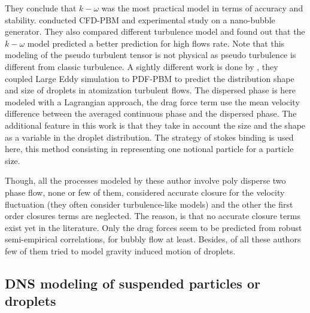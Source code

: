 They conclude that $k-\omega$ was the most practical model in terms of accuracy and stability.
\citet{alam2022cfd} conducted CFD-PBM and experimental study on a nano-bubble generator. 
They also compared different turbulence model and found out that the $k-\omega$ model predicted a better prediction for high flows rate.
Note that this modeling of the pseudo turbulent tensor is not physical as pseudo turbulence is different from classic turbulence.
A sightly different work is done by \citet{salehi2017population}, they coupled Large Eddy simulation to PDF-PBM to predict the distribution shape and size of droplets in atomization turbulent flows. 
The dispersed phase is here modeled with a Lagrangian approach, the drag force term use the mean velocity difference between the averaged continuous phase and the dispersed phase.
The additional feature in this work is that they take in account the size and the shape as a variable in the droplet distribution.
The strategy of stokes binding is used here, this method consisting in representing one notional particle for a particle size.

Though, all the processes modeled by these author involve poly disperse two phase flow, none or few of them, considered accurate closure for the velocity fluctuation (they often consider turbulence-like models) and the other the first order closures terms are neglected. 
The reason, is that no accurate closure terms exist yet in the literature. 
Only the drag forces seem to be predicted from robust semi-empirical correlations, for bubbly flow at least.
Besides, of all these authors few of them tried to model gravity induced motion of droplets. 

\subsection{DNS modeling of suspended particles or droplets}

